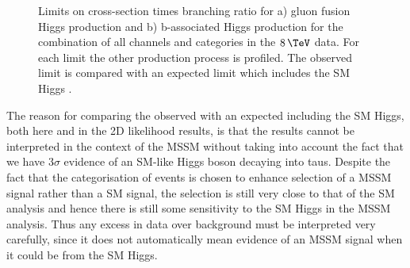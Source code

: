 \begin{figure}[tbh]
\caption[Limits on cross-section times branching ratio for a) gluon fusion Higgs
production and b) b-associated Higgs production for the combination of all
channels and categories in the $8\,\TeV$ data.]{Limits on cross-section times branching ratio for a) gluon fusion Higgs
production and b) b-associated Higgs production for the combination of all
channels and categories in the $8\,\TeV$ data. For each limit the other production process is
profiled. The observed limit is compared with an expected limit which includes
the SM Higgs \cite{HIG-13-021}.}
\label{fig:mssmModelIndependent}
\end{figure}

The reason for comparing the observed with an expected including the \ac{SM}
Higgs, both here and in the 2D likelihood results, 
is that the results cannot be interpreted in the context of the \ac{MSSM} without taking into account
the fact that we have $3\sigma$ evidence of an \ac{SM}-like Higgs boson decaying
into taus. Despite the fact that the categorisation of events is chosen to
enhance selection of a \ac{MSSM} signal rather than a \ac{SM} signal, the
selection is still very close to that of the \ac{SM} analysis and hence there is
still some sensitivity to the \ac{SM} Higgs in the \ac{MSSM} analysis. Thus any
excess in data over background must be interpreted very carefully, since it
does not automatically mean evidence of an \ac{MSSM} signal when it could be
from the \ac{SM} Higgs. 


